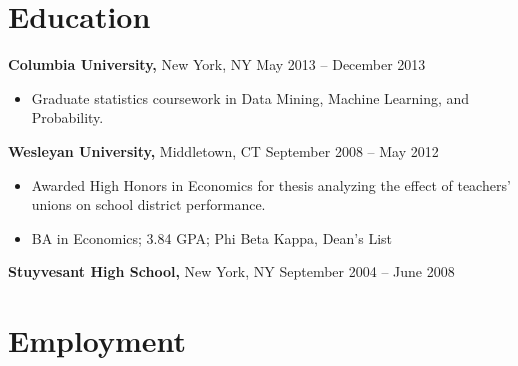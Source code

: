 \documentclass{res}
\begin{document}
 
\setlength{\parskip}{5.2pt}
\renewcommand{\labelitemi}{\scriptsize$\bullet$} 

\address{}
\address{\href{http://maxlivingston.org}{maxlivingston.org} | \href{http://github.com/maxliving}{github.com/maxliving}}

\begin{resume} 


\section{Education} 
  {\bf Columbia University,} New York, NY \hfill May 2013 -- December 2013
  \begin{itemize} \itemsep -2pt
  \item Graduate statistics coursework in Data Mining, Machine Learning, and Probability.
  \end{itemize}
  {\bf Wesleyan University,} Middletown, CT \hfill September 2008 -- May 2012
  \begin{itemize} \itemsep -2pt
  \item Awarded High Honors in Economics for thesis analyzing the effect of teachers' unions on school district performance.
  \item BA in Economics; 3.84 GPA; Phi Beta Kappa, Dean's List
  \end{itemize}

  {\bf Stuyvesant High School,} New York, NY \hfill September 2004 -- June 2008
  

  \section{Employment}


\end{resume}
\end{document}

